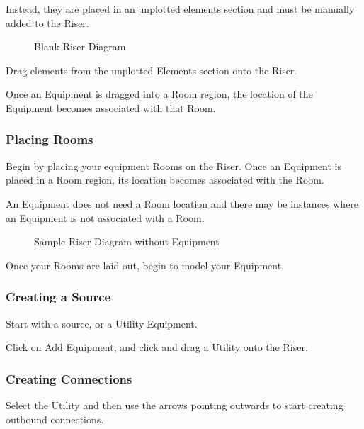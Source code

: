\documentclass[letterpaper,10pt,english]{sphinxmanual}
\begin{document}
Instead, they are placed in an unplotted elements section and must be manually added to the Riser.

\begin{figure}[H]
\centering
\capstart

\noindent{}
\caption{Blank Riser Diagram}\label{\detokenize{docs/tutorial/index-tutorial:id9}}\end{figure}

Drag elements from the unplotted Elements section onto the Riser.

\begin{figure}[H]
\centering

\noindent{}
\end{figure}

Once an Equipment is dragged into a Room region, the location of the Equipment becomes associated with that Room.


\subsubsection{Placing Rooms}
\label{\detokenize{docs/tutorial/index-tutorial:placing-rooms}}
Begin by placing your equipment Rooms on the Riser.  Once an Equipment is placed in a Room region, its location becomes associated with the Room.

An Equipment does not need a Room location and there may be instances where an Equipment is not associated with a Room.

\begin{figure}[H]
\centering
\capstart

\noindent{}
\caption{Sample Riser Diagram without Equipment}\label{\detokenize{docs/tutorial/index-tutorial:id10}}\end{figure}

Once your Rooms are laid out, begin to model your Equipment.


\subsubsection{Creating a Source}
\label{\detokenize{docs/tutorial/index-tutorial:creating-a-source}}
Start with a source, or a Utility Equipment.

Click on Add Equipment, and click and drag a Utility onto the Riser.


\subsubsection{Creating Connections}
\label{\detokenize{docs/tutorial/index-tutorial:creating-connections}}
Select the Utility and then use the arrows pointing outwards to start creating outbound connections.
\end{document}

